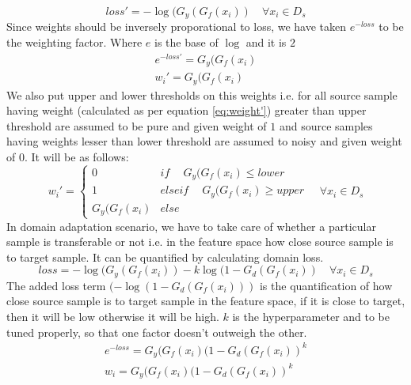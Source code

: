 \begin{equation*}
    loss' = -\log(G_y(G_f(x_i)) \quad \forall x_i \in D_s
\end{equation*}
Since weights should be inversely proporational to loss, we have taken $e^{-loss}$ to be the weighting factor. Where $e$ is the base of $\log$ and it is $2$
\begin{equation}
\label{eq:weight'}
\begin{align}
    e^{-loss'} = G_y(G_f(x_i)\\
    w_{i}' =     G_y(G_f(x_i)
\end{align}
\end{equation}
We also put upper and lower thresholds on this weights i.e. for all source sample having weight (calculated as per equation \ref{eq:weight'}) greater than upper threshold are assumed to be pure and given weight of $1$ and source samples having weights lesser than lower threshold are assumed to noisy and given weight of $0$. It will be as follows:
\begin{equation*}
                w_{i}' = \begin{cases}
		            0 & if\ \quad G_y(G_f(x_i) \le lower \\
		            1 & elseif\ \quad G_y(G_f(x_i) \ge upper \\
		            G_y(G_f(x_i) & else\ 
		            \end{cases} \quad \forall x_i \in D_s
\end{equation*}
In domain adaptation scenario, we have to take care of whether a particular sample is transferable or not i.e. in the feature space how close source sample is to target sample. It can be quantified by calculating domain loss.
\begin{equation}
    loss = -\log(G_y(G_f(x_i)) - k \log(1 - G_d(G_f(x_i)) \quad \forall x_i \in D_s
\end{equation}
The added loss term $(-\log(1 - G_d(G_f(x_i)))$ is the quantification of how close source sample is to target sample in the feature space, if it is close to target, then it will be low otherwise it will be high. $k$ is the hyperparameter and to be tuned properly, so that one factor doesn't outweigh the other.
\begin{equation}
\begin{align}
    e^{-loss} = G_y(G_f(x_i)(1 - G_d(G_f(x_i))^k\\
    w_{i} =     G_y(G_f(x_i)(1 - G_d(G_f(x_i))^k
\end{align}
\end{equation}

